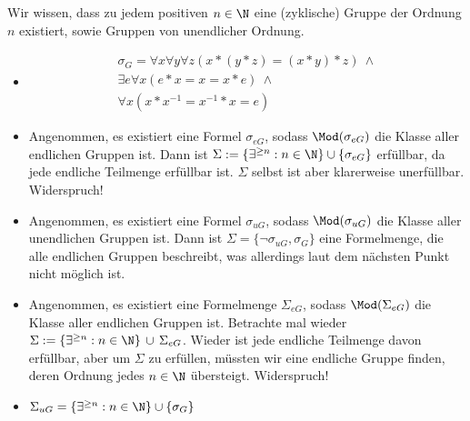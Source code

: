 \begin{solution}
Wir wissen, dass zu jedem positiven $n \in \N$ eine (zyklische) Gruppe der Ordnung $n$
existiert, sowie Gruppen von unendlicher Ordnung.
\begin{itemize}
  \item
  \begin{align*}
    \sigma_G = \forall x \forall y \forall z (x*(y*z) = (x*y)*z)\ \land \\
    \exists e \forall x (e*x = x = x*e)\ \land \\
    \forall x (x * x^{-1} = x^{-1} * x = e)
  \end{align*}
  \item Angenommen, es existiert eine Formel $\sigma_{eG}$, sodass $\Mod(\sigma_{eG})$
  die Klasse aller endlichen Gruppen ist. Dann ist $\Sigma := \{\exists^{\geq n}: n \in \N\} \cup \{\sigma_{eG}\}$ erfüllbar, da jede endliche Teilmenge erfüllbar ist.
  $\Sigma$ selbst ist aber klarerweise unerfüllbar. Widerspruch!
  \item Angenommen, es existiert eine Formel $\sigma_{uG}$, sodass $\Mod(\sigma_{uG})$ die Klasse aller unendlichen Gruppen ist. Dann ist $\Sigma = \{\neg \sigma_{uG}, \sigma_G\}$ eine
  Formelmenge, die alle endlichen Gruppen beschreibt, was allerdings laut dem
  nächsten Punkt nicht möglich ist.
  \item Angenommen, es existiert eine Formelmenge $\Sigma_{eG}$, sodass $\Mod(\Sigma_{eG})$
  die Klasse aller endlichen Gruppen ist.
  Betrachte mal wieder $\Sigma := \{\exists^{\geq n}: n \in \N\}\, \cup\, \Sigma_{eG}$.
  Wieder ist jede endliche Teilmenge davon erfüllbar, aber um $\Sigma$ zu erfüllen,
  müssten wir eine endliche Gruppe finden, deren Ordnung jedes $n \in \N$ übersteigt.
  Widerspruch!
  \item $\Sigma_{uG} = \{\exists^{\geq n}: n \in \N\} \cup \{\sigma_G\}$
\end{itemize}

\end{solution}

